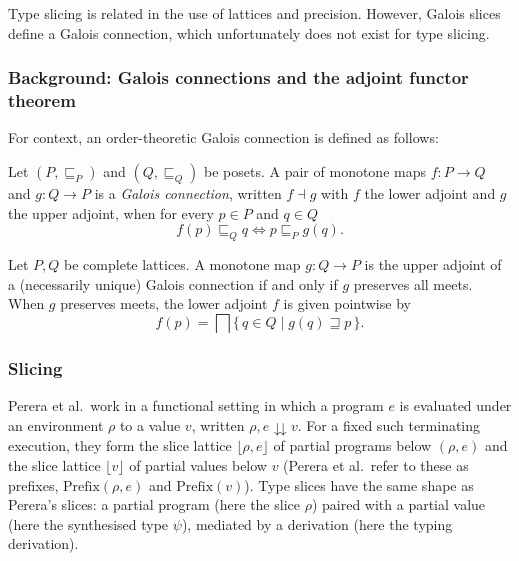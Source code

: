 Type slicing is related in the use of lattices and precision. However, Galois slices define a Galois connection, which unfortunately does not exist for type slicing.

\subsubsection{Background: Galois connections and the adjoint functor theorem}
\label{sec:cmp-galois-aft}

For context, an order-theoretic Galois connection is defined as follows:

\begin{definition}
Let $(P, \sqsubseteq_P)$ and $(Q, \sqsubseteq_Q)$ be posets. A pair of monotone maps $f : P \to Q$ and $g : Q \to P$ is a \emph{Galois connection}, written $f \dashv g$ with $f$ the lower adjoint and $g$ the upper adjoint, when for every $p \in P$ and $q \in Q$
\[
  f(p) \sqsubseteq_Q q \iff p \sqsubseteq_P g(q).
\]
\end{definition}

\begin{proposition}
Let $P, Q$ be complete lattices. A monotone map $g : Q \to P$ is the upper adjoint of a (necessarily unique) Galois connection if and only if $g$ preserves all meets. When $g$ preserves meets, the lower adjoint $f$ is given pointwise by
\[
  f(p) = \bigsqcap \{\, q \in Q \mid g(q) \sqsupseteq p \,\}.
\]
\end{proposition}

\subsubsection{Slicing}
\label{sec:cmp-galois-perera}

Perera et al.\ work in a functional setting in which a program $e$ is evaluated under an environment $\rho$ to a value $v$, written $\rho, e \downdownarrows v$. For a fixed such terminating execution, they form the slice lattice $\lfloor \rho, e \rfloor$ of partial programs below $(\rho, e)$ and the slice lattice $\lfloor v \rfloor$ of partial values below $v$ (Perera et al.\ refer to these as prefixes, $\mathrm{Prefix}(\rho, e)$ and $\mathrm{Prefix}(v)$). Type slices have the same shape as Perera's slices: a partial program (here the slice $\rho$) paired with a partial value (here the synthesised type $\psi$), mediated by a derivation (here the typing derivation).

